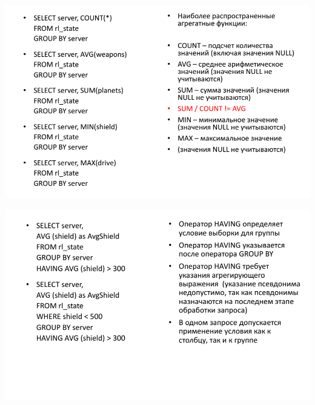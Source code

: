 \documentclass{beamer}
\begin{document}
\begin{frame}
\begin{center}
\includegraphics[scale=0.5]{images/avg.png}
\end{center}
\end{frame} 

\begin{frame}
\begin{center}
\includegraphics[scale=0.5]{images/having.png}
\end{center}
\end{frame} 
\end{document}
